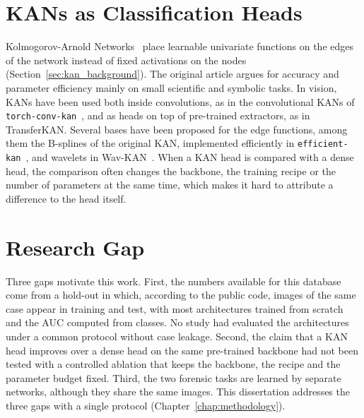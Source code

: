 \section{KANs as Classification Heads}
\label{sec:kan_related}

Kolmogorov-Arnold Networks~\cite{liu2024kan} place learnable univariate functions on the edges of the network instead of fixed activations on the nodes (Section~\ref{sec:kan_background}). The original article argues for accuracy and parameter efficiency mainly on small scientific and symbolic tasks. In vision, KANs have been used both inside convolutions, as in the convolutional KANs of \texttt{torch-conv-kan}~\cite{drokin2024torchconvkan}, and as heads on top of pre-trained extractors, as in TransferKAN. Several bases have been proposed for the edge functions, among them the B-splines of the original KAN, implemented efficiently in \texttt{efficient-kan}~\cite{efficientkan}, and wavelets in Wav-KAN~\cite{bozorgasl2024wavkan}. When a KAN head is compared with a dense head, the comparison often changes the backbone, the training recipe or the number of parameters at the same time, which makes it hard to attribute a difference to the head itself.

\section{Research Gap}
\label{sec:research_gap}

Three gaps motivate this work. First, the numbers available for this database come from a hold-out in which, according to the public code, images of the same case appear in training and test, with most architectures trained from scratch and the AUC computed from classes. No study had evaluated the architectures under a common protocol without case leakage. Second, the claim that a KAN head improves over a dense head on the same pre-trained backbone had not been tested with a controlled ablation that keeps the backbone, the recipe and the parameter budget fixed. Third, the two forensic tasks are learned by separate networks, although they share the same images. This dissertation addresses the three gaps with a single protocol (Chapter~\ref{chap:methodology}).
